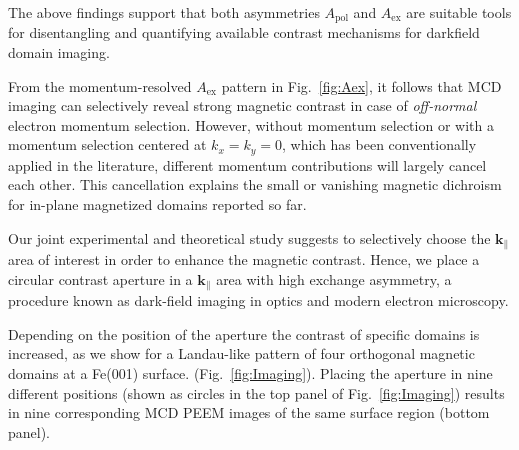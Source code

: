 \documentclass[prl,twocolumn,floatfix,superscriptaddress,aps]{revtex4-2}
\renewcommand{\vec}[1]{\boldsymbol{#1}}
\begin{document}
The above findings support that both asymmetries $A_{\mathrm{pol}}$ and $A_{\mathrm{ex}}$ are suitable tools for disentangling and quantifying available contrast mechanisms for darkfield domain imaging. 

From the momentum-resolved $A_{\mathrm{ex}}$ pattern in Fig.~\ref{fig:Aex}, it follows that MCD imaging can selectively reveal strong magnetic contrast in case of \emph{off-normal} electron momentum selection. However, without momentum selection or with a momentum selection centered at $k_x = k_y = 0$, which has been conventionally applied in the literature, different momentum contributions will largely cancel each other. This cancellation explains the small or vanishing magnetic dichroism for in-plane magnetized domains reported so far.

Our joint experimental and theoretical study suggests to selectively choose the $\vec{k}_{\parallel}$ area of interest in order to enhance the magnetic contrast. Hence, we place a circular contrast aperture in a $\vec{k}_{\parallel}$ area with high exchange asymmetry, a procedure known as dark-field imaging in optics and modern electron microscopy. 

Depending on the position of the aperture the contrast of specific domains is increased, as we show for a Landau-like pattern of four orthogonal magnetic domains at a Fe(001) surface. (Fig.~\ref{fig:Imaging}). Placing the aperture in nine different positions (shown as circles in the top panel of Fig.~\ref{fig:Imaging})  results in nine corresponding MCD PEEM images of the same surface region (bottom panel). 
\end{document}
